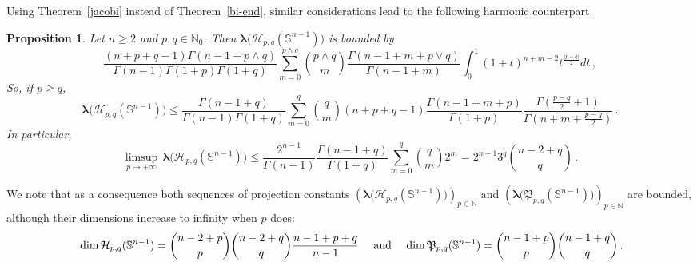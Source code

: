 \documentclass[12pt]{amsart}
\numberwithin{subsection}{section}
\newtheorem{proposition}[theorem]{Proposition}
\theoremstyle{definition}
\theoremstyle{remark}
\begin{document}
\smallskip

 Using Theorem~\ref{jacobi} instead  of Theorem~\ref{bi-end}, similar considerations lead to  the following harmonic counterpart.



\begin{proposition} \label{prop: bound harm}
  Let   $n \ge 2  $ and $p,q \in \mathbb{N}_0$. Then  $\boldsymbol{\lambda}\big(\mathcal{H}_{p,q}(\mathbb{S}^{n-1})\big) $ is bounded by
  \begin{equation}\label{uno-H}
  \frac{(n+p+q-1)\Gamma(n-1+p \wedge q)}{\Gamma(n-1)\Gamma(1+p) \Gamma(1+q)}
  \sum_{m=0}^{p \wedge q} \binom{p \wedge q}{m} \frac{\Gamma(n-1+m+p \vee q)}{\Gamma(n-1+m)}
  \int_{0}^{1} (1+t)^{n+m-2} t^{\frac{\vert p-q \vert}{2}}  dt\,,
  \end{equation}
  So, if  $p\geq q $,
      \begin{equation}\label{due-H}
      \boldsymbol{\lambda}\big(\mathcal{H}_{p,q}(\mathbb{S}^{n-1})\big)
      \leq
  \frac{\Gamma(n-1+q)}{\Gamma(n-1) \Gamma(1+q)}
  \sum_{m=0}^{q} \binom{q}{m}(n+p+q-1)
    \frac{\Gamma(n-1+m+p)}{\Gamma(1+p)}
        \frac{\Gamma(\frac{p-q}{2}+1)}{\Gamma(n+m+\frac{p-q}{2})}\,.
      \end{equation}
    \vspace{2mm}
    In particular,
       \begin{equation}\label{tres-H}
       \limsup_{p \to + \infty} \, \boldsymbol{\lambda}\big(\mathcal{H}_{p,q}(\mathbb{S}^{n-1})\big)
  \leq \frac{2^{n-1}}{\Gamma(n-1)}  \frac{\Gamma(n-1+q)}{\Gamma(1+q)}
  \sum_{m=0}^{q} \binom{q}{m} 2^{m} = 2^{n-1}3^q\binom{n-2+q}{q}
      \,.
      \end{equation}
    \end{proposition}


We note that as a consequence both  sequences of projection constants $\left(\boldsymbol{\lambda}\big(\mathcal{H}_{p,q}(\mathbb{S}^{n-1})\big)\right)_{p\in\mathbb N}$ and $\left(\boldsymbol{\lambda}\big(\mathfrak{P}_{p,q}(\mathbb{S}^{n-1})\big)\right)_{p\in\mathbb N}$ are bounded, although
their dimensions increase to infinity when  $p $ does:
  \[
  \text{
   $\dim \mathcal{H}_{p,q}(\mathbb{S}^{n-1}) = \binom{n-2+p}{p}\binom{n-2+q}{q}\frac{n-1+p+q}{n-1} $
  \quad and \quad
   $\dim \mathfrak{P}_{p,q}(\mathbb{S}^{n-1}) = \binom{n-1+p}{p}\binom{n-1+q}{q} $\,.}
  \]
\end{document}
